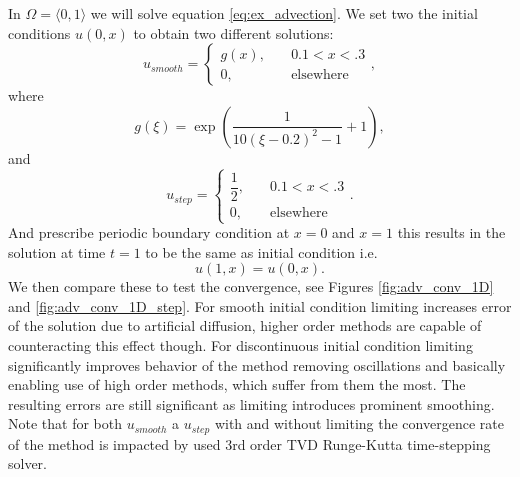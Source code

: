\begin{example}[Advection 1D]
\label{ex:adv1D}
In $\Omega = \langle 0, 1 \rangle$ we will solve equation \eqref{eq:ex_advection}.
We set two the initial conditions $u(0, x)$ to obtain two different solutions:
\begin{equation}
u_{smooth} = \begin{cases}
g(x),\quad &0.1 < x < .3\\
0, \quad &\text{elsewhere}
\end{cases},
\end{equation}
where
\begin{equation}
g(\xi) = \exp\left(\frac{1}{10(\xi - 0.2)^2 - 1}+ 1\right),
\end{equation}
and
\begin{equation}
u_{step} = \begin{cases}
\dfrac{1}{2},\quad &0.1 < x < .3\\
0, \quad &\text{elsewhere}
\end{cases}.
\end{equation}
And prescribe periodic boundary condition at $x = 0 $ and $x = 1$  this 
results in the solution at time $t = 1$ to be the same as initial condition 
i.e.
\begin{equation}
u(1, x) = u(0, x).
\end{equation} 
We then compare these to test the convergence, see Figures 
\ref{fig:adv_conv_1D} and \ref{fig:adv_conv_1D_step}. For smooth initial condition 
limiting increases error of the solution due to artificial diffusion, higher order 
methods are capable of counteracting this effect though. For discontinuous initial 
condition limiting significantly improves behavior of the method removing oscillations 
and basically enabling use of high order methods, which suffer from them the most. The 
resulting errors are still significant as limiting introduces prominent 
smoothing. Note that for both $u_{smooth}$ a $u_{step}$ with and without limiting the 
convergence rate of the method is impacted by used 3rd order TVD Runge-Kutta 
time-stepping solver. 
\end{example}

